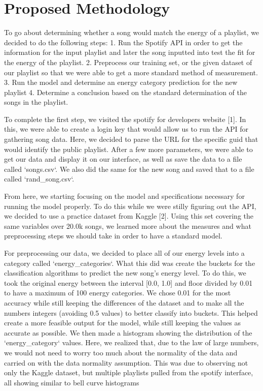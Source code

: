 \documentclass{article}
\begin{document}
\section{Proposed Methodology}
To go about determining whether a song would match the energy of a playlist, we decided to do the following steps:
1. Run the Spotify API in order to get the information for the input playlist and later the song inputted into test the fit for the energy of the playlist.
2. Preprocess our training set, or the given dataset of our playlist so that we were able to get a more standard method of measurement. 
3. Run the model and determine an energy category prediction for the new playlist
4. Determine a conclusion based on the standard determination of the songs in the playlist.

To complete the first step, we visited the spotify for developers website [1]. In this, we were able to create a login key that would allow us to run the API for gathering song data. Here, we decided to parse the URL for the specific guid that would identify the public playlist. After a few more parameters, we were able to get our data and display it on our interface, as well as save the data to a file called `songs.csv`. We also did the same for the new song and saved that to a file called `rand_song.csv`.

From here, we starting focusing on the model and specifications necessary for running the model properly. To do this while we were stilly figuring out the API, we decided to use a practice dataset from Kaggle [2]. Using this set covering the same variables over 20.0k songs, we learned more about the measures and what preprocessing steps we should take in order to have a standard model.

For preprocessing our data, we decided to place all of our energy levels into a category called `energy_categories`. What this did was create the buckets for the classification algorithms to predict the new song's energy level. To do this, we took the original energy between the interval  [0.0, 1.0] and floor divided by 0.01 to have a maximum of 100 energy categories. We chose 0.01 for the most accuracy while still keeping the differences of the dataset and to make all the numbers integers (avoiding 0.5 values) to better classify into buckets. This helped create a more feasible output for the model, while still keeping the values as accurate as possible. We then made a histogram showing the distribution of the `energy_category` values. Here, we realized that, due to the law of large numbers, we would not need to worry too much about the normality of the data and carried on with the data normality assumption. This was due to observing not only the Kaggle dataset, but multiple playlists pulled from the spotify interface, all showing similar to bell curve histograms
\end{document}
